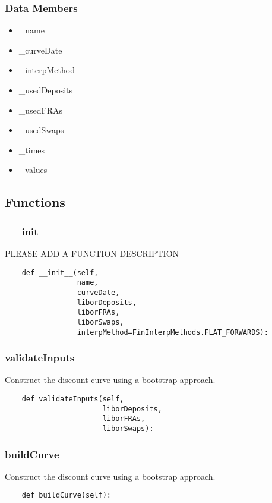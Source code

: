 \documentclass[twoside,11pt]{book}
\begin{document}
\subsubsection*{Data Members}
\begin{itemize}
\item{\_name}
\item{\_curveDate}
\item{\_interpMethod}
\item{\_usedDeposits}
\item{\_usedFRAs}
\item{\_usedSwaps}
\item{\_times}
\item{\_values}
\end{itemize}

\subsection*{Functions}

\subsubsection*{{\bf \_\_init\_\_}}
PLEASE ADD A FUNCTION DESCRIPTION

\begin{lstlisting}
    def __init__(self,
                 name,
                 curveDate,
                 liborDeposits,
                 liborFRAs,
                 liborSwaps,
                 interpMethod=FinInterpMethods.FLAT_FORWARDS):
\end{lstlisting}

\subsubsection*{{\bf validateInputs}}
Construct the discount curve using a bootstrap approach.  

\begin{lstlisting}
    def validateInputs(self,
                       liborDeposits,
                       liborFRAs,
                       liborSwaps):
\end{lstlisting}

\subsubsection*{{\bf buildCurve}}
Construct the discount curve using a bootstrap approach.  

\begin{lstlisting}
    def buildCurve(self):
\end{lstlisting}
\end{document}
